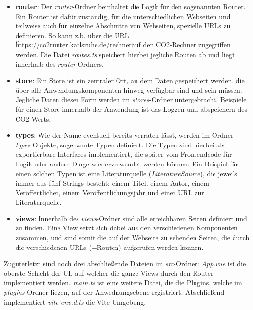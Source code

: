 \begin{itemize}
    \item \textbf{router}: Der \textit{router}-Ordner beinhaltet die Logik für den sogenannten Router. Ein Router ist dafür zuständig, für die unterschiedlichen Webseiten und teilweise auch für einzelne Abschnitte von Webseiten, spezielle URLs zu definieren. So kann z.b. über die URL \"https://co2runter.karlsruhe.de/rechner\" auf den CO2-Rechner zugegriffen werden. Die Datei \textit{routes.ts} speichert hierbei jegliche Routen ab und liegt innerhalb des \textit{router}-Ordners.
    \item \textbf{store}: Ein Store ist ein zentraler Ort, an dem Daten gespeichert werden, die über alle Anwendungskomponenten hinweg verfügbar sind und sein müssen. Jegliche Daten dieser Form werden im \textit{stores}-Ordner untergebracht. Beispiele für einen Store innerhalb der Anwendung ist das Loggen und abspeichern des CO2-Werts.
    \item \textbf{types}: Wie der Name eventuell bereits verraten lässt, werden im Ordner \textit{types} Objekte, sogenannte Typen definiert. Die Typen sind hierbei als exportierbare Interfaces implementiert, die später vom Frontendcode für Logik oder andere Dinge wiederverwendet werden können. Ein Beispiel für einen solchen Typen ist eine Literaturquelle (\textit{LiteratureSource}), die jeweils immer aus fünf Strings besteht: einem Titel, einem Autor, einem Veröffentlicher, einem Veröffentlichungsjahr und einer URL zur Literaturquelle.
    \item \textbf{views}: Innerhalb des \textit{views}-Ordner sind alle erreichbaren Seiten definiert und zu finden. Eine View setzt sich dabei aus den verschiedenen Komponenten zusammen, und sind somit die auf der Webseite zu sehenden Seiten, die durch die verschiedenen URLs (=Routen) aufgerufen werden können.
\end{itemize}

Zuguterletzt sind noch drei abschließende Dateien im \textit{src}-Ordner: \textit{App.vue} ist die oberste Schicht der UI, auf welcher die ganze Views durch den Router implementiert werden. \textit{main.ts} ist eine weitere Datei, die die Plugins, welche im \textit{plugins}-Ordner liegen, auf der Anwednungsebene registriert. Abschließend implementiert \textit{vite-env.d.ts} die Vite-Umgebung.

